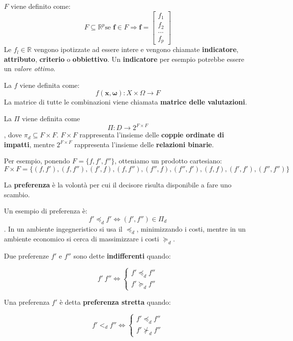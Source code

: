 \documentclass[\main/main.tex]{subfiles}
\begin{document}
$F$ viene definito come: \[F \subseteq \mathbb{R}^p \text{se } \bm{f} \in F \Rightarrow \bm{f} = \begin{bmatrix}f_1\\ f_2\\...\\ f_p \end{bmatrix}\]
Le $f_l \in \mathbb{R}$ vengono ipotizzate ad essere intere e vengono chiamate \textbf{indicatore}, \textbf{attributo}, \textbf{criterio} o \textbf{obbiettivo}. Un \textbf{indicatore} per esempio potrebbe essere un \textit{valore ottimo}.

La $f$ viene definita come: \[ f(\bm{x},\bm{\omega}): X\times\Omega \rightarrow F \]
La matrice di tutte le combinazioni viene chiamata \textbf{matrice delle valutazioni}.

La $\Pi$ viene definita come \[\Pi: D \rightarrow 2^{F\times F}\], dove $\pi_d \subseteq F\times F$. $F\times F$ rappresenta l'insieme delle \textbf{coppie ordinate di impatti}, mentre $2^{F \times F}$ rappresenta l'insieme delle \textbf{relazioni binarie}.

Per esempio, ponendo $F = \{f, f', f''\}$, otteniamo un prodotto cartesiano: \[F \times F = \{ (f,f'), (f,f''), (f', f), (f, f''), (f'', f), (f'', f'), (f, f), (f', f'), (f'', f'') \}\]

La \textbf{preferenza} è la volontà per cui il decisore risulta disponibile a fare uno scambio.

Un esempio di preferenza è: \[ f' \preccurlyeq_d f' \Leftrightarrow (f', f'')\in \Pi_d \]. In un ambiente ingegneristico si usa il $\preccurlyeq_d$, minimizzando i costi, mentre in un ambiente economico si cerca di massimizzare i costi $\succcurlyeq_d$.

\begin{definition}[indifferenza]
	Due preferenze $f'$ e $f''$ sono dette \textbf{indifferenti} quando:

	\[
		f' ~ f'' \Leftrightarrow \begin{cases} f' \preccurlyeq_d f'' \\ f' \succcurlyeq_d f'' \end{cases}
	\]
\end{definition}

\begin{definition}
	Una preferenza $f'$ è detta \textbf{preferenza stretta} quando:

	\[
		f' <_d f'' \Leftrightarrow
		\begin{cases}
			f' \preccurlyeq_d f'' \\
			f' \nsucc_d f''
		\end{cases}
	\]
\end{definition}
\end{document}
